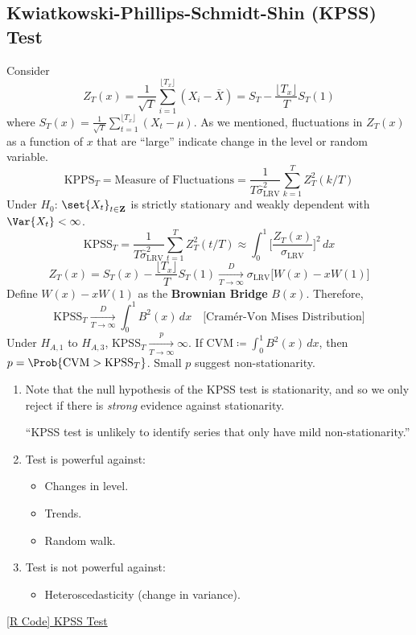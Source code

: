 \subsection*{Kwiatkowski-Phillips-Schmidt-Shin (KPSS) Test}
Consider
\[ Z_T(x)=\frac{1}{\sqrt{T}} \sum_{i=1}^{\lfloor T_x \rfloor} (X_i-\bar{X})=S_T-\frac{\lfloor T_x\rfloor}{T}S_T(1)  \]
where $ S_T(x)=\frac{1}{\sqrt{T}} \sum_{t=1}^{\lfloor T_x\rfloor} (X_t-\mu) $. As we mentioned,
fluctuations in $ Z_T(x) $ as a function of $ x $ that are ``large'' indicate change in the
level or random variable.
\[ \text{KPPS}_T=\text{Measure of Fluctuations}=\frac{1}{T\hat{\sigma}^2_{\text{LRV}}}\sum_{k=1}^{T} Z_T^2(k/T)  \]
Under $ H_0 $: $ \set{X_t}_{t\in\mathbf{Z}} $ is strictly stationary and weakly dependent
with $ \Var{X_t}<\infty $.
\[ \text{KPSS}_T=\frac{1}{T\hat{\sigma}_{\text{LRV}}^2}\sum_{t=1}^{T} Z_T^2(t/T)\approx
    \int_{0}^1 \biggl[\frac{Z_T(x)}{\sigma_{\text{LRV}}}\biggr]^{2}\, dx   \]
\[ Z_T(x)=S_T(x)-\frac{\lfloor T_x\rfloor}{T}S_T(1)\xrightarrow[T\to\infty]{D}
    \sigma_{\text{LRV}}\bigl[W(x)-x W(1)\bigr]  \]
Define $ W(x)-x W(1) $ as the \textbf{Brownian Bridge} $ B(x) $. Therefore,
\[ \text{KPSS}_T\xrightarrow[T\to\infty]{D}\int_0^1 B^2(x)\, dx\quad\text{[Cramér-Von Mises Distribution]} \]
Under $ H_{A,1} $ to $ H_{A,3} $, $ \text{KPSS}_T\xrightarrow[T\to\infty]{p}\infty $. If
$ \text{CVM}\coloneq \int_{0}^{1} B^2(x)\, d{x} $,
then $ p=\Prob{\text{CVM}>\text{KPSS}_T} $. Small $ p $ suggest non-stationarity.
\begin{Remark}{}{}
    \begin{enumerate}[(1)]
        \item Note that the null hypothesis of the KPSS test is stationarity, and so we only
              reject if there is \emph{strong} evidence against stationarity.

              ``KPSS test is unlikely to identify series that only have mild non-stationarity.''
        \item Test is powerful against:
              \begin{itemize}
                  \item Changes in level.
                  \item Trends.
                  \item Random walk.
              \end{itemize}
        \item Test is not powerful against:
              \begin{itemize}
                  \item Heteroscedasticity (change in variance).
              \end{itemize}
    \end{enumerate}
\end{Remark}
\href{https://github.com/Hextical/university-notes/blob/master/year-3/semester-2/STAT%20443/code/10.5%20-%20KPSS%20Test.R}{[R Code] KPSS Test}

